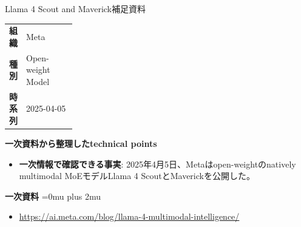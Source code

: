 \begin{technicalnote}{Llama 4 Scout and Maverick}{補足資料}
\begingroup
\begin{tabularx}{\linewidth}{@{}>{\bfseries}p{0.22\linewidth}X@{}}
組織 & Meta \\
種別 & Open-weight Model \\
時系列 & 2025-04-05 \\
\end{tabularx}
\smallskip
\begin{minipage}{\linewidth}
{\bfseries 一次資料から整理したtechnical points}
\begin{itemize}[leftmargin=1.5em,itemsep=0.35em]
\item \textbf{一次情報で確認できる事実}: 2025年4月5日、Metaはopen-weightのnatively multimodal MoEモデルLlama 4 ScoutとMaverickを公開した。
\end{itemize}
\begin{samepage}
{\bfseries 一次資料}
\begingroup\sloppy
\Urlmuskip=0mu plus 2mu\relax
\begin{itemize}[leftmargin=1.5em,itemsep=0.25em]
\item {\scriptsize\url{https://ai.meta.com/blog/llama-4-multimodal-intelligence/}}
\end{itemize}
\endgroup
\end{samepage}
\end{minipage}
\endgroup
\end{technicalnote}
\medskip

